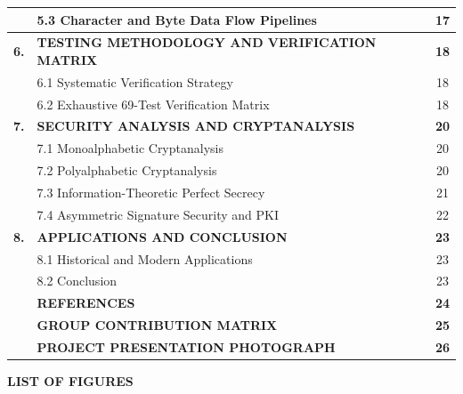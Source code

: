 \documentclass[12pt,a4paper]{report}
\begin{document}
\begin{table}[h!]
\begin{tabular}{|c|p{4.7in}|c|}
& 5.3 Character and Byte Data Flow Pipelines & 17 \\
\hline
\textbf{6.} & \textbf{TESTING METHODOLOGY AND VERIFICATION MATRIX} & \textbf{18} \\
& 6.1 Systematic Verification Strategy & 18 \\
& 6.2 Exhaustive 69-Test Verification Matrix & 18 \\
\hline
\textbf{7.} & \textbf{SECURITY ANALYSIS AND CRYPTANALYSIS} & \textbf{20} \\
& 7.1 Monoalphabetic Cryptanalysis & 20 \\
& 7.2 Polyalphabetic Cryptanalysis & 20 \\
& 7.3 Information-Theoretic Perfect Secrecy & 21 \\
& 7.4 Asymmetric Signature Security and PKI & 22 \\
\hline
\textbf{8.} & \textbf{APPLICATIONS AND CONCLUSION} & \textbf{23} \\
& 8.1 Historical and Modern Applications & 23 \\
& 8.2 Conclusion & 23 \\
\hline
& \textbf{REFERENCES} & \textbf{24} \\
\hline
& \textbf{GROUP CONTRIBUTION MATRIX} & \textbf{25} \\
\hline
& \textbf{PROJECT PRESENTATION PHOTOGRAPH} & \textbf{26} \\
\hline
\end{tabular}
\end{table}

\newpage

\begin{center}
    {\fontsize{14}{16}\bfseries LIST OF FIGURES}\\[1.5em]
\end{center}
\end{document}
